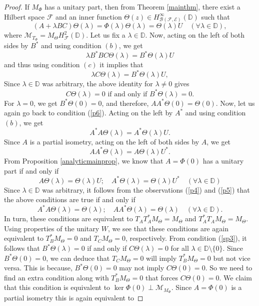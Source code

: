 \documentclass[12pt]{amsart}
\numberwithin{equation}{section}
\theoremstyle{definition}
\newcommand{\D}{\mathbb{D}}
\newcommand{\1}{{\mbox{\bf 1}}}
\newcommand{\clb}{\mathcal{B}}
\newcommand{\cle}{\mathcal{E}}
\newcommand{\clf}{\mathcal{F}}
\newcommand{\clm}{\mathcal{M}}
\begin{document}
\begin{proof}
If $M_{\Phi}$ has a unitary part, then from Theorem \ref{mainthm}, there exist a Hilbert space $\clf$ and an inner function $\Theta(z) \in H_{\clb(\clf,\cle)}^{\infty}(\D)$ such that 
\begin{equation}\label{p6}
(A + \lambda BC) \Theta(\lambda) = \Phi(\lambda) \Theta(\lambda) = \Theta(\lambda) U \quad (\forall \lambda \in \D),
\end{equation}
where $\clm_{T_{\Phi}} = M_{\Theta} H_{\clf}^2(\D)$.  Let us fix a $\lambda \in \D$. Now, acting on the left of both sides by $B^*$ and using condition $(b)$, we get
\[
\lambda B^*B C\Theta(\lambda) = B^* \Theta(\lambda)U
\] 
and thus using condition $(c)$ it implies that
\begin{equation}\label{sp3}
\lambda C\Theta(\lambda) = B^* \Theta(\lambda)U,
\end{equation}
Since $\lambda \in \D$ was arbitrary, the above identity for $\lambda \neq 0$ gives
\begin{equation}\label{p7}
C \Theta(\lambda) = 0 \text{ if and only if }  B^* \Theta(\lambda) = 0.
\end{equation}
For $\lambda = 0$, we get $B^* \Theta(0) = 0$, and therefore, $AA^* \Theta(0) = \Theta(0)$. Now, let us again go back to condition (\ref{p6}). Acting on the left  by $A^*$ and using condition $(b)$, we get
\begin{equation}\label{p4}
A^* A \Theta(\lambda) = A^* \Theta(\lambda)U.\end{equation}
Since $A$ is a partial isometry, acting on the left of both sides by $A$, we get
\begin{equation}\label{p5}
A A^* \Theta(\lambda) = A \Theta(\lambda)U^*.
\end{equation}
From Proposition \ref{analyticmainprop}, we know that $A = \Phi(0)$ has a unitary part if and only if 
\begin{equation}\label{p3}
A \Theta(\lambda) = \Theta(\lambda) U; \quad A^*\Theta(\lambda) = \Theta(\lambda) U^* \quad (\forall \lambda \in \D)
\end{equation}  
Since $\lambda \in \D$ was arbitrary, it follows from the observations (\ref{p4}) and (\ref{p5}) that the above conditions are true if and only if 
\[
A^* A \Theta(\lambda) = \Theta(\lambda); \quad AA^* \Theta(\lambda) = \Theta(\lambda) \quad (\forall \lambda \in \D).
\]
In turn, these conditions are equivalent to $T_A T_A^* M_{\Theta} = M_{\Theta}$ and $T_A^* T_A M_{\Theta} = M_{\Theta}$.  Using properties of the unitary $W$, we see that these conditions are again equivalent to $ T_B^* M_{\Theta} = 0$ and $T_C M_{\Theta} =  0$, respectively.  From condition (\ref{sp3}), it follows that $B^* \Theta(\lambda) = 0$ if and only if $C \Theta(\lambda) = 0$ for all $\lambda \in \D \setminus \{0\}$. Since $B^* \Theta(0) = 0$, we can deduce that $T_C M_{\Theta} = 0$ will imply $T_B^* M_{\Theta} = 0$ but not vice versa. This is because, $B^* \Theta(0) = 0$ may not imply $C \Theta(0) = 0$. So we need to find an extra condition along with $T_B^* M_{\Theta} = 0$ that forces $C \Theta(0) = 0$. We claim that this condition is equivalent to $\ker \Phi(0) \perp \clm_{M_{\Phi}}$. Since $A = \Phi(0)$ is a partial isometry this is again equivalent to 

\end{proof}
\end{document}
